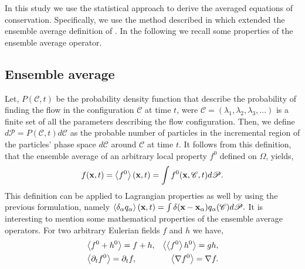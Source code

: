 In this study we use the statistical approach to derive the averaged equations of conservation. 
Specifically, we use the method described in \citet{zhang2021ensemble} which extended the ensemble average definition of \citet{batchelor1972sedimentation}. 
In the following we recall some properties of the ensemble average operator. 

\subsection{Ensemble average}

Let, $P(\mathscr{C},t)$ be the probability density function that describe the probability of finding the flow in the configuration $\mathscr{C}$ at time $t$, were $\mathscr{C} = (\lambda_1,\lambda_2,\lambda_3,\ldots)$ is a finite set of all the parameters describing the flow configuration. 
Then, we define $d\mathscr{P} = P(\mathscr{C},t)d\mathscr{C}$ as the probable number of particles in the incremental region of the particles' phase space $d\mathscr{C}$ around $\mathscr{C}$ at time $t$. 
It follows from this definition, that the ensemble average of an arbitrary local property $f^0$ defined on $\Omega$, yields,
\begin{equation}
    f(\textbf{x},t)
    = \left<f^0\right>(\textbf{x},t)
    =\int f^0(\textbf{x},\mathscr{C},t) d\mathscr{P}. 
    \label{eq:avg}
\end{equation}  
This definition can be applied to Lagrangian properties as well by using the previous formulation, namely $\left<\delta_\alpha q_\alpha\right>(\textbf{x},t) = \int \delta(\textbf{x} - \textbf{x}_\alpha) q_\alpha(\mathscr{C}) d\mathscr{P}. $
It is interesting to mention some mathematical properties of the ensemble average operators. 
For two arbitrary Eulerian fields $f$ and $h$ we have,
\begin{align}
    &\left<f^0+h^0\right> = f+h, 
    &\left<\left<f^0\right>h^0\right> = gh, \nonumber \\
    &\left<\partial_t f^0\right> 
    = \partial_t f, 
    &\left<\mathbf{\nabla} f^0\right>
    = \mathbf{\nabla} f. 
    \label{eq:avg_properties}
\end{align}

